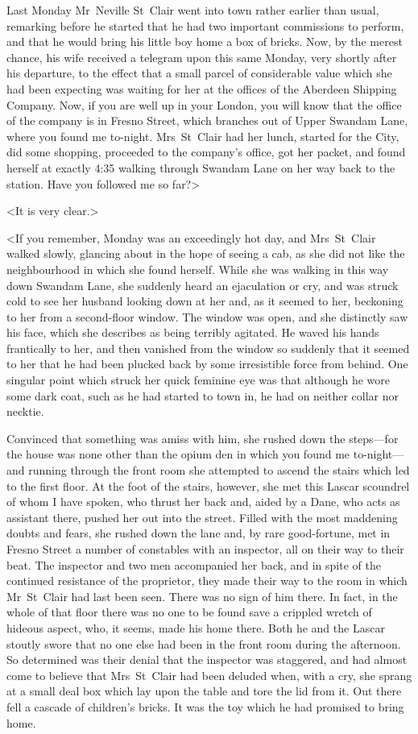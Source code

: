 Last Monday Mr~Neville St~Clair went into town rather earlier than usual, remarking before he started that he had two important commissions to perform, and that he would bring his little boy home a box of bricks. Now, by the merest chance, his wife received a telegram upon this same Monday, very shortly after his departure, to the effect that a small parcel of considerable value which she had been expecting was waiting for her at the offices of the Aberdeen Shipping Company. Now, if you are well up in your London, you will know that the office of the company is in Fresno Street, which branches out of Upper Swandam Lane, where you found me to-night. Mrs~St~Clair had her lunch, started for the City, did some shopping, proceeded to the company's office, got her packet, and found herself at exactly 4:35 walking through Swandam Lane on her way back to the station. Have you followed me so far?>

<It is very clear.>

<If you remember, Monday was an exceedingly hot day, and Mrs~St~Clair walked slowly, glancing about in the hope of seeing a cab, as she did not like the neighbourhood in which she found herself. While she was walking in this way down Swandam Lane, she suddenly heard an ejaculation or cry, and was struck cold to see her husband looking down at her and, as it seemed to her, beckoning to her from a second-floor window. The window was open, and she distinctly saw his face, which she describes as being terribly agitated. He waved his hands frantically to her, and then vanished from the window so suddenly that it seemed to her that he had been plucked back by some irresistible force from behind. One singular point which struck her quick feminine eye was that although he wore some dark coat, such as he had started to town in, he had on neither collar nor necktie.

Convinced that something was amiss with him, she rushed down the steps—for the house was none other than the opium den in which you found me to-night—and running through the front room she attempted to ascend the stairs which led to the first floor. At the foot of the stairs, however, she met this Lascar scoundrel of whom I have spoken, who thrust her back and, aided by a Dane, who acts as assistant there, pushed her out into the street. Filled with the most maddening doubts and fears, she rushed down the lane and, by rare good-fortune, met in Fresno Street a number of constables with an inspector, all on their way to their beat. The inspector and two men accompanied her back, and in spite of the continued resistance of the proprietor, they made their way to the room in which Mr~St~Clair had last been seen. There was no sign of him there. In fact, in the whole of that floor there was no one to be found save a crippled wretch of hideous aspect, who, it seems, made his home there. Both he and the Lascar stoutly swore that no one else had been in the front room during the afternoon. So determined was their denial that the inspector was staggered, and had almost come to believe that Mrs~St~Clair had been deluded when, with a cry, she sprang at a small deal box which lay upon the table and tore the lid from it. Out there fell a cascade of children's bricks. It was the toy which he had promised to bring home.

